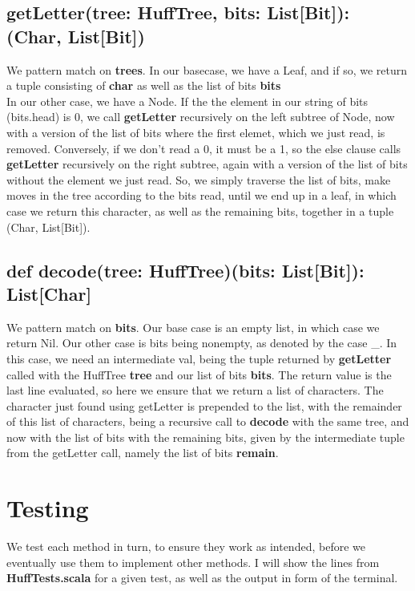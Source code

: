 \documentclass{article}
\begin{document}
\subsection{getLetter(tree: HuffTree, bits: List[Bit]): (Char, List[Bit])}
We pattern match on \textbf{trees}. In our basecase, we have a Leaf, and if so, we return a tuple consisting of \textbf{char} as well as the list of bits \textbf{bits}
\newline
\\
In our other case, we have a Node. If the the element in our string of bits (bits.head) is 0, we call \textbf{getLetter} recursively on the left subtree of Node, now with a version of the list of bits where the first elemet, which we just read, is removed.
Conversely, if we don't read a 0, it must be a 1, so the else clause calls \textbf{getLetter} recursively on the right subtree, again with a version of the list of bits without the element we just read. So, we simply traverse the list of bits, make moves in the tree according to the bits read, until we end up in a leaf, in which case we return this character, as well as the remaining bits, together in a tuple (Char, List[Bit]).  


\subsection{def decode(tree: HuffTree)(bits: List[Bit]): List[Char]}
We pattern match on \textbf{bits}. Our base case is an empty list, in which case we return Nil. Our other case is bits being nonempty, as denoted by the case \_. In this case, we need an intermediate val, being the tuple returned by \textbf{getLetter} called with the HuffTree \textbf{tree} and our list of bits \textbf{bits}. The return value is the last line evaluated, so here we ensure that we return a list of characters. The character just found using getLetter is prepended to the list, with the remainder of this list of characters, being a recursive call to \textbf{decode} with the same tree, and now with the list of bits with the remaining bits, given by the intermediate tuple from the getLetter call, namely  the list of bits \textbf{remain}. 




\section{Testing}
We test each method in turn, to ensure they work as intended, before we eventually use them to implement other methods. I will show the lines from \textbf{HuffTests.scala} for a given test, as well as the output in form of the terminal.  
\end{document}
